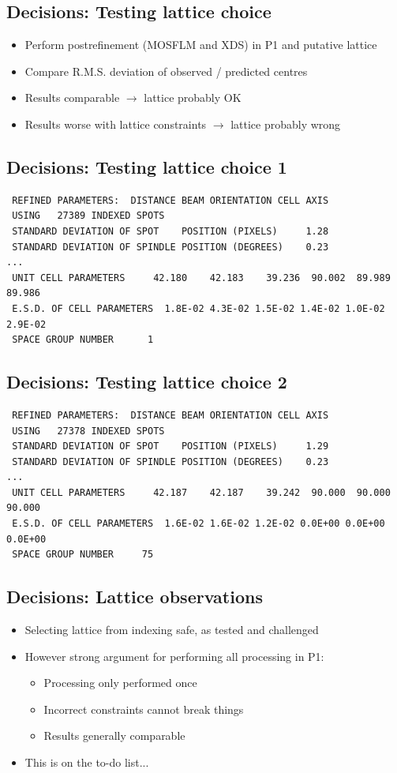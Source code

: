 \documentclass[a4paper, 11pt]{article}
\begin{document}
\subsection{Decisions: Testing lattice choice}
\begin{itemize}
\item{Perform postrefinement (MOSFLM and XDS) in P1 and putative lattice}
\item{Compare R.M.S. deviation of observed / predicted centres}
\item{Results comparable $\rightarrow$ lattice probably OK}
\item{Results worse with lattice constraints $\rightarrow$ lattice probably
wrong}
\end{itemize}

\subsection{Decisions: Testing lattice choice 1}
{\small
\begin{verbatim}
 REFINED PARAMETERS:  DISTANCE BEAM ORIENTATION CELL AXIS                   
 USING   27389 INDEXED SPOTS
 STANDARD DEVIATION OF SPOT    POSITION (PIXELS)     1.28
 STANDARD DEVIATION OF SPINDLE POSITION (DEGREES)    0.23
...
 UNIT CELL PARAMETERS     42.180    42.183    39.236  90.002  89.989  89.986
 E.S.D. OF CELL PARAMETERS  1.8E-02 4.3E-02 1.5E-02 1.4E-02 1.0E-02 2.9E-02
 SPACE GROUP NUMBER      1
\end{verbatim}
}

\subsection{Decisions: Testing lattice choice 2}
{\small
\begin{verbatim}
 REFINED PARAMETERS:  DISTANCE BEAM ORIENTATION CELL AXIS                   
 USING   27378 INDEXED SPOTS
 STANDARD DEVIATION OF SPOT    POSITION (PIXELS)     1.29
 STANDARD DEVIATION OF SPINDLE POSITION (DEGREES)    0.23
...
 UNIT CELL PARAMETERS     42.187    42.187    39.242  90.000  90.000  90.000
 E.S.D. OF CELL PARAMETERS  1.6E-02 1.6E-02 1.2E-02 0.0E+00 0.0E+00 0.0E+00
 SPACE GROUP NUMBER     75
\end{verbatim}
}

\subsection{Decisions: Lattice observations}
\begin{itemize}
\item{Selecting lattice from indexing safe, as tested and challenged}
\item{However strong argument for performing all processing in P1:
\begin{itemize}
\item{Processing only performed once}
\item{Incorrect constraints cannot break things}
\item{Results generally comparable}
\end{itemize}
}
\item{This is on the to-do list...}
\end{itemize}
\end{document}
